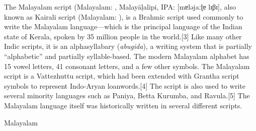 The Malayalam script (Malayalam: , Malayāḷalipi, IPA: [mɐləjaːɭɐ lɪβɪ], also known as Kairali script (Malayalam: ), is a Brahmic script used commonly to write the Malayalam language—which is the principal language of the Indian state of Kerala, spoken by 35 million people in the world.[3] Like many other Indic scripts, it is an alphasyllabary (\textit{abugida}), a writing system that is partially “alphabetic” and partially syllable-based. The modern Malayalam alphabet has 15 vowel letters, 41 consonant letters, and a few other symbols. The Malayalam script is a Vattezhuttu script, which had been extended with Grantha script symbols to represent Indo-Aryan loanwords.[4] The script is also used to write several minority languages such as Paniya, Betta Kurumba, and Ravula.[5] The Malayalam language itself was historically written in several different scripts.

\begin{scriptexample}[]{Malayalam}
\centerline{\Huge{}}
\end{scriptexample}